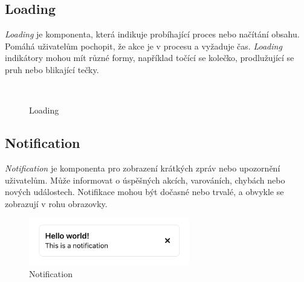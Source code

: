 \subsection{Loading}
\emph{Loading} je komponenta, která indikuje probíhající proces nebo načítání obsahu. Pomáhá uživatelům pochopit, že akce je v procesu a vyžaduje čas. \emph{Loading} indikátory mohou mít různé formy, například točící se kolečko, prodlužující se pruh nebo blikající tečky.

\begin{figure}[H]
  \centering
  \hspace{1cm}
  \\
  \captionsetup{justification=centering,margin=2cm}
  \caption{Loading}
\end{figure}

\subsection{Notification}
\emph{Notification} je komponenta pro zobrazení krátkých zpráv nebo upozornění uživatelům. Může informovat o úspěšných akcích, varováních, chybách nebo nových událostech. Notifikace mohou být dočasné nebo trvalé, a obvykle se zobrazují v rohu obrazovky.

\begin{figure}[H]
  \centering
  \includegraphics[width=7cm]{images/notification}
  \captionsetup{justification=centering,margin=2cm}
  \caption{Notification} \label{picture:notification}
\end{figure}

